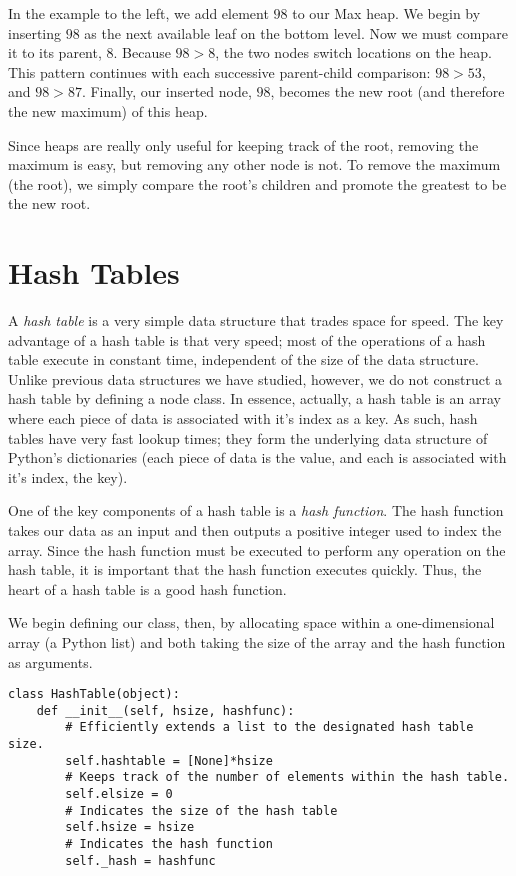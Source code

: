 \begin{minipage}{.35\textwidth}
In the example to the left, we add element $98$ to our Max heap.
We begin by inserting $98$ as the next available leaf on the bottom level.
Now we must compare it to its parent, $8$.
Because $98 > 8$, the two nodes switch locations on the heap.
This pattern continues with each successive parent-child comparison: $98 > 53$, and $98 > 87$.
Finally, our inserted node, $98$, becomes the new root (and therefore the new maximum) of this heap.
\end{minipage}

Since heaps are really only useful for keeping track of the root, removing the maximum is easy, but removing any other node is not.
To remove the maximum (the root), we simply compare the root's children and promote the greatest to be the new root.

\section*{Hash Tables}
A \emph{hash table} is a very simple data structure that trades space for speed.
The key advantage of a hash table is that very speed; most of the operations of a hash table execute in constant time, independent of the size of the data structure.
Unlike previous data structures we have studied, however, we do not construct a hash table by defining a node class.
In essence, actually, a hash table is an array where each piece of data is associated with it's index as a key.
As such, hash tables have very fast lookup times; they form the underlying data structure of Python's dictionaries (each piece of data is the value, and each is associated with it's index, the key).

One of the key components of a hash table is a \emph{hash function}.
The hash function takes our data as an input and then outputs a positive integer used to index the array.
Since the hash function must be executed to perform any operation on the hash table, it is important that the hash function executes quickly.
Thus, the heart of a hash table is a good hash function.

We begin defining our  class, then, by allocating space within a one-dimensional array (a Python list) and both taking the size of the array and the hash function as arguments.
\begin{lstlisting}
class HashTable(object):
    def __init__(self, hsize, hashfunc):
        # Efficiently extends a list to the designated hash table size.
        self.hashtable = [None]*hsize
        # Keeps track of the number of elements within the hash table.
        self.elsize = 0
        # Indicates the size of the hash table
        self.hsize = hsize
        # Indicates the hash function
        self._hash = hashfunc
\end{lstlisting}

